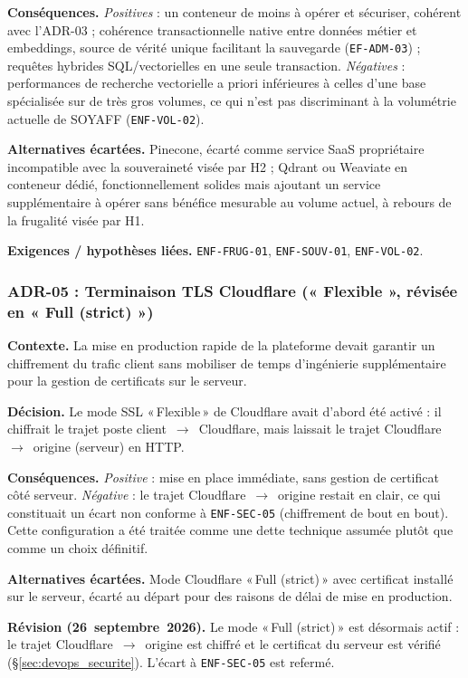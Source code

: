 \textbf{Conséquences.} \textit{Positives} : un conteneur de moins à opérer et sécuriser, cohérent avec l'ADR-03 ; cohérence transactionnelle native entre données métier et embeddings, source de vérité unique facilitant la sauvegarde (\texttt{EF-ADM-03}) ; requêtes hybrides SQL/vectorielles en une seule transaction. \textit{Négatives} : performances de recherche vectorielle a priori inférieures à celles d'une base spécialisée sur de très gros volumes, ce qui n'est pas discriminant à la volumétrie actuelle de SOYAFF (\texttt{ENF-VOL-02}).

\textbf{Alternatives écartées.} Pinecone, écarté comme service SaaS propriétaire incompatible avec la souveraineté visée par H2 ; Qdrant ou Weaviate en conteneur dédié, fonctionnellement solides mais ajoutant un service supplémentaire à opérer sans bénéfice mesurable au volume actuel, à rebours de la frugalité visée par H1.

\textbf{Exigences / hypothèses liées.} \texttt{ENF-FRUG-01}, \texttt{ENF-SOUV-01}, \texttt{ENF-VOL-02}.

\subsubsection*{ADR-05 : Terminaison TLS Cloudflare (« Flexible », révisée en « Full (strict) »)}
\textbf{Contexte.} La mise en production rapide de la plateforme devait garantir un chiffrement du trafic client sans mobiliser de temps d'ingénierie supplémentaire pour la gestion de certificats sur le serveur.

\textbf{Décision.} Le mode SSL «\,Flexible\,» de Cloudflare avait d'abord été activé : il chiffrait le trajet poste client~$\rightarrow$~Cloudflare, mais laissait le trajet Cloudflare~$\rightarrow$~origine (serveur) en HTTP.

\textbf{Conséquences.} \textit{Positive} : mise en place immédiate, sans gestion de certificat côté serveur. \textit{Négative} : le trajet Cloudflare~$\rightarrow$~origine restait en clair, ce qui constituait un écart non conforme à \texttt{ENF-SEC-05} (chiffrement de bout en bout). Cette configuration a été traitée comme une dette technique assumée plutôt que comme un choix définitif.

\textbf{Alternatives écartées.} Mode Cloudflare «\,Full (strict)\,» avec certificat installé sur le serveur, écarté au départ pour des raisons de délai de mise en production.

\textbf{Révision (26~septembre~2026).} Le mode «\,Full (strict)\,» est désormais actif : le trajet Cloudflare~$\rightarrow$~origine est chiffré et le certificat du serveur est vérifié (§\ref{sec:devops_securite}). L'écart à \texttt{ENF-SEC-05} est refermé.

